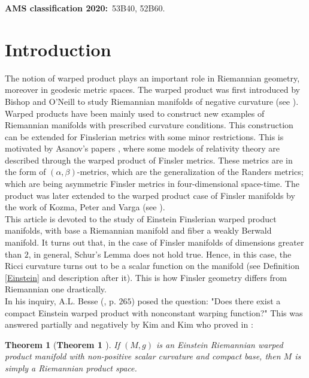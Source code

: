 \documentclass[pdflatex,sn-mathphys-num]{sn-jnl}%
\theoremstyle{thmstyleone}%
\newtheorem{theorem}{Theorem}%
\theoremstyle{thmstyletwo}%
\theoremstyle{thmstylethree}%
\begin{document}
\textbf{AMS classification 2020:}~53B40, 52B60.\\
\tableofcontents


\section{\textbf{Introduction}}\label{Intro}
	The notion of warped product plays an important role in Riemannian geometry,
	moreover in geodesic metric spaces.  The warped product was first introduced by Bishop and O'Neill to study Riemannian manifolds of negative curvature (see \cite{lota}). Warped products have been mainly used to construct  new examples of Riemannian manifolds with prescribed 
	curvature conditions.  This
	construction can be extended for Finslerian metrics with some minor restrictions.
	This is motivated by Asanov's papers \cite{gsa,gsa1}, where some models of relativity theory
	are described through the warped product of Finsler metrics. These metrics are in the form of $(\alpha,\beta)$-metrics, which are the generalization of the Randers metrics; which are being asymmetric Finsler metrics in  four-dimensional space-time. The product was later extended to the 
	warped product case of Finsler manifolds by the work of Kozma, Peter and Varga (see \cite{LPC}). \\
 

This article is devoted to the study of Einstein Finslerian 
warped product manifolds, with base a Riemannian manifold
and fiber a weakly Berwald manifold. It turns out that,
in the case of Finsler manifolds of dimensions greater than $2$, in general,  Schur's Lemma  does not hold true. 
Hence, in this case, the Ricci curvature turns out to be a
scalar function on the manifold (see Definition \ref{Einstein} and description after it). 
This is how Finsler geometry differs from Riemannian one drastically. \\


In his inquiry, A.L. Besse (\cite{bas}, p. $265$)  posed the question: "Does  there exist a compact Einstein warped product with nonconstant warping function?" 
This was answered partially and negatively by 
Kim and Kim who proved in \cite{kim}:
\vspace{0.15in}

\begin{theorem}[\textbf{Theorem 1 \cite[\boldmath p. $2573$]{kim}}]\label{kk}
If  $(M, g)$ is an Einstein Riemannian warped product manifold with non-positive scalar curvature and compact base, then $M$ is simply a Riemannian product space.
 \end{theorem}
 
\end{document}
